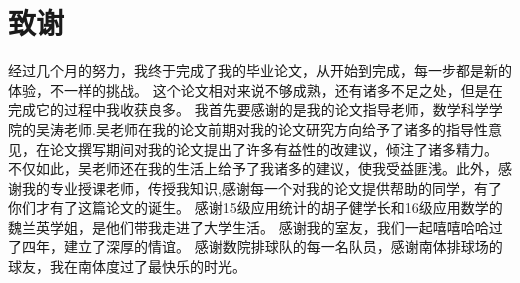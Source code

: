 \chapter{致谢}
经过几个月的努力，我终于完成了我的毕业论文，从开始到完成，每一步都是新的体验，不一样的挑战。
这个论文相对来说不够成熟，还有诸多不足之处，但是在完成它的过程中我收获良多。
我首先要感谢的是我的论文指导老师，数学科学学院的吴涛老师.吴老师在我的论文前期对我的论文研究方向给予了诸多的指导性意见，在论文撰写期间对我的论文提出了许多有益性的改建议，倾注了诸多精力。
不仅如此，吴老师还在我的生活上给予了我诸多的建议，使我受益匪浅。此外，感谢我的专业授课老师，传授我知识,感谢每一个对我的论文提供帮助的同学，有了你们才有了这篇论文的诞生。
感谢15级应用统计的胡子健学长和16级应用数学的魏兰英学姐，是他们带我走进了大学生活。
感谢我的室友，我们一起嘻嘻哈哈过了四年，建立了深厚的情谊。
感谢数院排球队的每一名队员，感谢南体排球场的球友，我在南体度过了最快乐的时光。